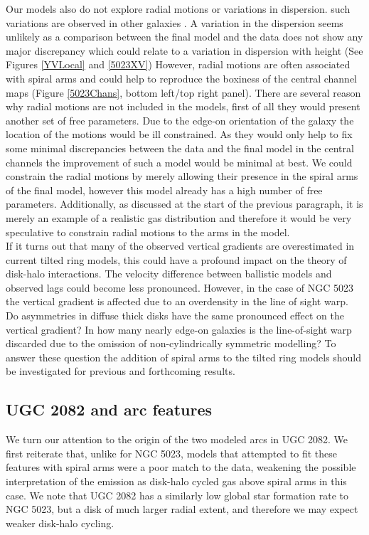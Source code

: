 \documentclass[useAMS,usenatbib]{mn2e}
\begin{document}
{ \indent Our models also do not explore radial motions or variations in dispersion. such variations are observed in other galaxies \citep{2002AJ....123.3124F, 2005A&A...439..947B,Oosterloo2007}. A variation in the dispersion seems unlikely as a comparison between the final model and the data does not show any major discrepancy which could relate to a variation in dispersion with height (See Figures \ref{YVLocal} and \ref{5023XV}) However, radial motions are often associated with spiral arms and could help to reproduce the boxiness of the central channel maps (Figure \ref{5023Chans}, bottom left/top right panel). There are several reason why radial motions are not included in the models, first of all they would present another set of free parameters. Due to the edge-on orientation of the galaxy the location of the motions would be ill constrained. As they would only help to fix some minimal discrepancies between the data and the final model in the central channels the improvement of such a model would be minimal at best. We could constrain the radial motions by merely allowing their presence in the spiral arms of the final model, however this model already has a high number of free parameters. Additionally, as discussed at the start of the previous paragraph, it is merely an example of a realistic gas distribution and therefore it would be very speculative to constrain radial motions to the arms in the model.\\  
\indent If it turns out that many of the observed vertical gradients are overestimated in current tilted ring models, this could have a profound impact on the theory of disk-halo interactions. The velocity difference between ballistic models and observed lags \citep{2008MNRAS.386..935F} could become less pronounced. However, in the case of NGC 5023 the vertical gradient is affected due to an overdensity in the line of sight warp. Do asymmetries in diffuse thick disks have the same pronounced effect on the vertical gradient? In how many nearly edge-on galaxies is the line-of-sight warp discarded due to the omission of non-cylindrically symmetric modelling? To answer these question the addition of spiral arms to the tilted ring models should be investigated for previous and forthcoming results.\\  
\subsection{UGC 2082 and arc features}
We turn our attention to the origin of the two modeled arcs in UGC
2082.  We first reiterate that, unlike for NGC 5023, models that
attempted to fit these features with spiral arms were a poor match to
the data, weakening the possible interpretation of the emission as
disk-halo cycled gas above spiral arms in this case.  We note that UGC
2082 has a similarly low global star formation rate to NGC 5023, but a
disk of much larger radial extent, and therefore we may expect weaker disk-halo
cycling.

}
\end{document}
